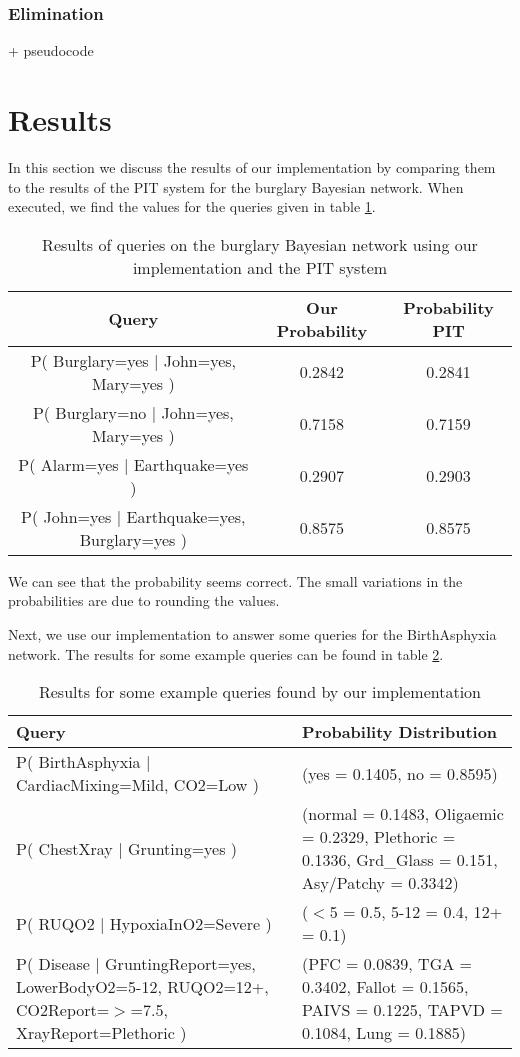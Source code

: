 \documentclass[10pt,a4paper]{article}
\begin{document}
\subsubsection{Elimination}
+ pseudocode
\section{Results}
In this section we discuss the results of our implementation by comparing them to the results of the PIT system for the burglary Bayesian network. When executed, we find the values for the queries given in table \ref{tableburglary}.
\begin{table}[H]
\begin{tabular}{|c|c|c|}
\hline 
\textbf{Query} & \textbf{Our Probability} & \textbf{Probability PIT} \\ 
\hline 
P( Burglary=yes $|$ John=yes, Mary=yes ) & 0.2842 & 0.2841 \\ 
\hline 
P( Burglary=no $|$ John=yes, Mary=yes ) & 0.7158 & 0.7159 \\ 
\hline 
P( Alarm=yes $|$ Earthquake=yes ) & 0.2907 & 0.2903 \\ 
\hline 
P( John=yes $|$ Earthquake=yes, Burglary=yes ) & 0.8575 & 0.8575 \\ 
\hline 
\end{tabular} 
\caption{Results of queries on the burglary Bayesian network using our implementation and the PIT system}
\label{tableburglary}
\end{table}

We can see that the probability seems correct. The small variations in the probabilities are due to rounding the values.

Next, we use our implementation to answer some queries for the BirthAsphyxia network. The results  for some example queries can be found in table \ref{tablespiegelhalter}.

\begin{table}[H]
\begin{tabular}{|p{9cm}|p{7cm}|}
\hline 
\textbf{Query} & \textbf{Probability Distribution} \\ 
\hline 
P( BirthAsphyxia $|$ CardiacMixing=Mild, CO2=Low ) & (yes = 0.1405, no = 0.8595) \\ 
\hline 
P( ChestXray $|$ Grunting=yes ) & (normal = 0.1483, Oligaemic = 0.2329, Plethoric = 0.1336, Grd\_Glass = 0.151, Asy/Patchy = 0.3342) \\ 
\hline 
P( RUQO2 $|$ HypoxiaInO2=Severe ) & ($<$5 = 0.5, 5-12 = 0.4, 12+ = 0.1) \\ 
\hline 
P( Disease $|$ GruntingReport=yes, LowerBodyO2=5-12, RUQO2=12+, CO2Report=$>$=7.5, XrayReport=Plethoric ) & (PFC = 0.0839, TGA = 0.3402, Fallot = 0.1565, PAIVS = 0.1225, TAPVD = 0.1084, Lung = 0.1885) \\ 
\hline 
\end{tabular} 
\caption{Results for some example queries found by our implementation}
\label{tablespiegelhalter}
\end{table}
\end{document}
